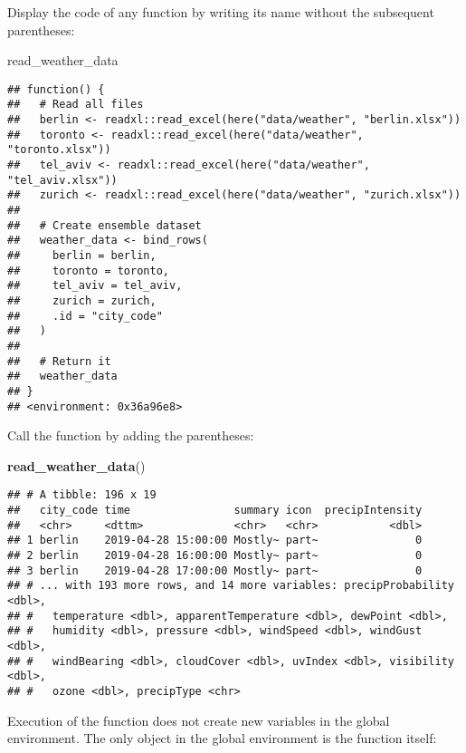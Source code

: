 \documentclass[]{book}
\newenvironment{Shaded}{\begin{snugshade}}{\end{snugshade}}
\newcommand{\KeywordTok}[1]{\textcolor[rgb]{0.13,0.29,0.53}{\textbf{#1}}}
\newcommand{\NormalTok}[1]{#1}
\begin{document}
Display the code of any function by writing its name without the subsequent parentheses:

\begin{Shaded}
\begin{Highlighting}[]
\NormalTok{read_weather_data}
\end{Highlighting}
\end{Shaded}

\begin{verbatim}
## function() {
##   # Read all files
##   berlin <- readxl::read_excel(here("data/weather", "berlin.xlsx"))
##   toronto <- readxl::read_excel(here("data/weather", "toronto.xlsx"))
##   tel_aviv <- readxl::read_excel(here("data/weather", "tel_aviv.xlsx"))
##   zurich <- readxl::read_excel(here("data/weather", "zurich.xlsx"))
## 
##   # Create ensemble dataset
##   weather_data <- bind_rows(
##     berlin = berlin,
##     toronto = toronto,
##     tel_aviv = tel_aviv,
##     zurich = zurich,
##     .id = "city_code"
##   )
## 
##   # Return it
##   weather_data
## }
## <environment: 0x36a96e8>
\end{verbatim}

Call the function by adding the parentheses:

\begin{Shaded}
\begin{Highlighting}[]
\KeywordTok{read_weather_data}\NormalTok{()}
\end{Highlighting}
\end{Shaded}

\begin{verbatim}
## # A tibble: 196 x 19
##   city_code time                summary icon  precipIntensity
##   <chr>     <dttm>              <chr>   <chr>           <dbl>
## 1 berlin    2019-04-28 15:00:00 Mostly~ part~               0
## 2 berlin    2019-04-28 16:00:00 Mostly~ part~               0
## 3 berlin    2019-04-28 17:00:00 Mostly~ part~               0
## # ... with 193 more rows, and 14 more variables: precipProbability <dbl>,
## #   temperature <dbl>, apparentTemperature <dbl>, dewPoint <dbl>,
## #   humidity <dbl>, pressure <dbl>, windSpeed <dbl>, windGust <dbl>,
## #   windBearing <dbl>, cloudCover <dbl>, uvIndex <dbl>, visibility <dbl>,
## #   ozone <dbl>, precipType <chr>
\end{verbatim}

Execution of the function does not create new variables in the global environment.
The only object in the global environment is the function itself:
\end{document}

